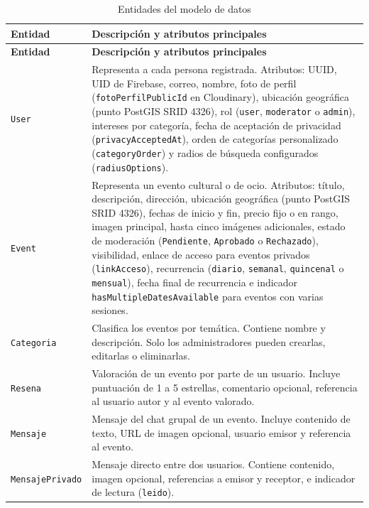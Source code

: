{\renewcommand{\arraystretch}{1.25}
\begin{longtable}{@{}>{\raggedright\arraybackslash}p{} >{\raggedright\arraybackslash}p{}@{}}
\caption{Entidades del modelo de datos}
\label{tab:entidades}\\
\toprule
\textbf{Entidad} & \textbf{Descripción y atributos principales} \\
\midrule
\endfirsthead
\toprule
\textbf{Entidad} & \textbf{Descripción y atributos principales} \\
\midrule
\endhead
\bottomrule
\endfoot
\texttt{User} & Representa a cada persona registrada. Atributos: UUID, UID de Firebase, correo, nombre, foto de perfil (\texttt{fotoPerfilPublicId} en Cloudinary), ubicación geográfica (punto PostGIS SRID 4326), rol (\texttt{user}, \texttt{moderator} o \texttt{admin}), intereses por categoría, fecha de aceptación de privacidad (\texttt{privacyAcceptedAt}), orden de categorías personalizado (\texttt{categoryOrder}) y radios de búsqueda configurados (\texttt{radiusOptions}). \\
\addlinespace
\texttt{Event} & Representa un evento cultural o de ocio. Atributos: título, descripción, dirección, ubicación geográfica (punto PostGIS SRID 4326), fechas de inicio y fin, precio fijo o en rango, imagen principal, hasta cinco imágenes adicionales, estado de moderación (\texttt{Pendiente}, \texttt{Aprobado} o \texttt{Rechazado}), visibilidad, enlace de acceso para eventos privados (\texttt{linkAcceso}), recurrencia (\texttt{diario}, \texttt{semanal}, \texttt{quincenal} o \texttt{mensual}), fecha final de recurrencia e indicador \texttt{hasMultipleDatesAvailable} para eventos con varias sesiones. \\
\addlinespace
\texttt{Categoria} & Clasifica los eventos por temática. Contiene nombre y descripción. Solo los administradores pueden crearlas, editarlas o eliminarlas. \\
\addlinespace
\texttt{Resena} & Valoración de un evento por parte de un usuario. Incluye puntuación de 1 a 5 estrellas, comentario opcional, referencia al usuario autor y al evento valorado. \\
\addlinespace
\texttt{Mensaje} & Mensaje del chat grupal de un evento. Incluye contenido de texto, URL de imagen opcional, usuario emisor y referencia al evento. \\
\addlinespace
\texttt{MensajePrivado} & Mensaje directo entre dos usuarios. Contiene contenido, imagen opcional, referencias a emisor y receptor, e indicador de lectura (\texttt{leido}). \\

\end{longtable}}
